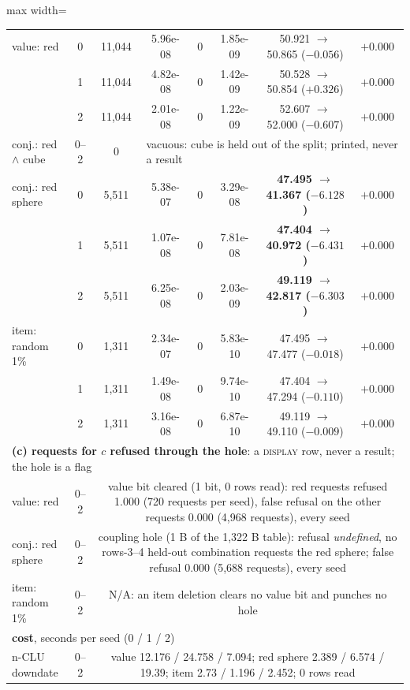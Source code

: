 \documentclass{article} %
\begin{document}
\begin{table}[t]
\begin{adjustbox}{max width=\linewidth}
\begin{tabular}{lccccccc}
value: red & 0 & 11,044 & 5.96e-08 & 0 & 1.85e-09 & 50.921 $\to$ 50.865 ($-0.056$) & $+0.000$ \\
 & 1 & 11,044 & 4.82e-08 & 0 & 1.42e-09 & 50.528 $\to$ 50.854 ($+0.326$) & $+0.000$ \\
 & 2 & 11,044 & 2.01e-08 & 0 & 1.22e-09 & 52.607 $\to$ 52.000 ($-0.607$) & $+0.000$ \\
conj.: red $\wedge$ cube & 0--2 & 0 & \multicolumn{5}{l}{vacuous: cube is held out of the split; printed, never a result} \\
conj.: red sphere & 0 & 5,511 & 5.38e-07 & 0 & 3.29e-08 & \textbf{47.495 $\to$ 41.367 ($-6.128$)} & $+0.000$ \\
 & 1 & 5,511 & 1.07e-08 & 0 & 7.81e-08 & \textbf{47.404 $\to$ 40.972 ($-6.431$)} & $+0.000$ \\
 & 2 & 5,511 & 6.25e-08 & 0 & 2.03e-09 & \textbf{49.119 $\to$ 42.817 ($-6.303$)} & $+0.000$ \\
item: random 1\% & 0 & 1,311 & 2.34e-07 & 0 & 5.83e-10 & 47.495 $\to$ 47.477 ($-0.018$) & $+0.000$ \\
 & 1 & 1,311 & 1.49e-08 & 0 & 9.74e-10 & 47.404 $\to$ 47.294 ($-0.110$) & $+0.000$ \\
 & 2 & 1,311 & 3.16e-08 & 0 & 6.87e-10 & 49.119 $\to$ 49.110 ($-0.009$) & $+0.000$ \\
\midrule
\multicolumn{8}{l}{\textbf{(c) requests for $c$ refused through the hole}: a \textsc{display} row, never a result; the hole is a flag} \\
value: red & 0--2 & \multicolumn{6}{p{10.6cm}}{value bit cleared (1 bit, 0 rows read): red requests refused 1.000 (720 requests per seed), false refusal on the other requests 0.000 (4,968 requests), every seed} \\
conj.: red sphere & 0--2 & \multicolumn{6}{p{10.6cm}}{coupling hole (1 B of the 1,322 B table): refusal \emph{undefined}, no rows-3--4 held-out combination requests the red sphere; false refusal 0.000 (5,688 requests), every seed} \\
item: random 1\% & 0--2 & \multicolumn{6}{p{10.6cm}}{N/A: an item deletion clears no value bit and punches no hole} \\
\midrule
\multicolumn{8}{l}{\textbf{cost}, seconds per seed (0 / 1 / 2)} \\
n-CLU downdate & 0--2 & \multicolumn{6}{p{10.6cm}}{value 12.176 / 24.758 / 7.094; red sphere 2.389 / 6.574 / 19.39; item 2.73 / 1.196 / 2.452; 0 rows read} \\

\end{tabular}
\end{adjustbox}
\end{table}
\end{document}
